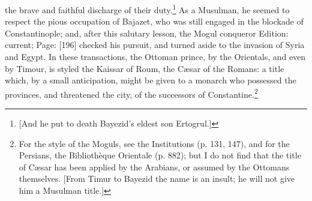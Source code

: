 the brave and faithful discharge of their duty.\footnote{[And he put to death Bayezid\texthebrew{}’s eldest son Ertogrul.]} As a Musulman, he seemed to respect the pious occupation of Bajazet, who was still engaged in the blockade of Constantinople; and, after this salutary lesson, the Mogul conqueror Edition: current; Page: [196] checked his pursuit, and turned aside to the invasion of Syria and Egypt. In these transactions, the Ottoman prince, by the Orientals, and even by Timour, is styled the Kaissar of Roum, the Cæsar of the Romans: a title which, by a small anticipation, might be given to a monarch who possessed the provinces, and threatened the city, of the successors of Constantine.\footnote{For the style of the Moguls, see the Institutions (p. 131, 147), and for the Persians, the Bibliothèque Orientale (p. 882); but I do not find that the title of Cæsar has been applied by the Arabians, or assumed by the Ottomans themselves. [From Timur to Bayezid the name is an insult; he will not give him a Musulman title.]}

